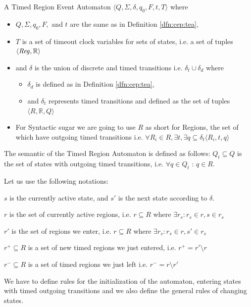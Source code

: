 			
				\begin{dfn}
					\label{dfn:cep:trea}
					A Timed Region Event Automaton $\langle Q,\Sigma,\delta,q_0, F, t, T \rangle$ where
					\begin{itemize}
						\item $Q, \Sigma, q_0, F,$ and  $t$ are the same as in Definition \ref{dfn:cep:tea},
						\item $T$ is a set of timeout clock variables for sets of states, i.e. a set of tuples $\langle \mathit{Reg}, \mathbb{R} \rangle$
						\item and $\delta$ is the union of discrete and timed transitions i.e. $\delta_t \cup \delta_d$ where
						\begin{itemize}
							\item $\delta_d$ is defined as in Definition \ref{dfn:cep:tea},
							\item and $\delta_t$ represents timed transitions and defined as the set of tuples $\langle R , \mathbb{R} , Q \rangle$ 
						\end{itemize}
						\item For Syntactic sugar we are going to use $R$ as short for Regions, the set of which have outgoing timed transitions 
						i.e. $ \forall R_i \in R , \exists t, \exists q  \subseteq \delta_t \langle R_i, t, q \rangle$ 
					\end{itemize}
				\end{dfn}
				
				The semantic of the Timed Region Automaton is defined as follows:
				$Q_t \subseteq Q$ is the set of states with outgoing timed transitions, 
				i.e. $\forall q \in Q_t$ : $ q \in R $. 
				
				
				Let us use the following notations: 
			
				$s$ is the currently active state, and $s'$ is the next state according to $\delta$.
			
				$r$ is the set of currently active regions, 
				i.e. $r \subseteq R$ where $\exists r_s : r_s \in r, s \in r_s $ 
				
				$r'$ is the set of regions we enter,
				i.e. $r \subseteq R$ where $\exists r_s :  r_s \in r, s' \in r_s $ 
				
				$r^+ \subseteq R$ is a set of new timed regions we just entered,
				i.e. $r^+ = r' \setminus r$ 
				
				$r^- \subseteq R$ is a set of timed regions we just left
				i.e. $r^- = r \setminus r'$
			
				We have to define rules for the initialization of the automaton,
				entering states with timed outgoing transitions 
				and we also define the general rules of changing states. 
				
